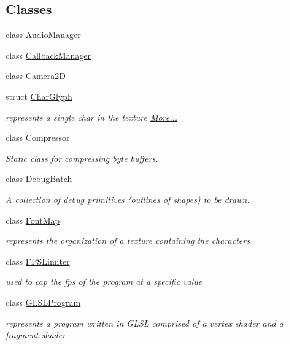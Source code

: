\subsection*{Classes}
\begin{DoxyCompactItemize}
\item 
class \hyperlink{classnta_1_1AudioManager}{Audio\+Manager}
\item 
class \hyperlink{classnta_1_1CallbackManager}{Callback\+Manager}
\item 
class \hyperlink{classnta_1_1Camera2D}{Camera2D}
\item 
struct \hyperlink{namespacenta_d4/d26/structnta_1_1CharGlyph}{Char\+Glyph}
\begin{DoxyCompactList}\small\item\em represents a single char in the texture  \hyperlink{namespacenta_d4/d26/structnta_1_1CharGlyph}{More...}\end{DoxyCompactList}\item 
class \hyperlink{classnta_1_1Compressor}{Compressor}
\begin{DoxyCompactList}\small\item\em Static class for compressing byte buffers. \end{DoxyCompactList}\item 
class \hyperlink{classnta_1_1DebugBatch}{Debug\+Batch}
\begin{DoxyCompactList}\small\item\em A collection of debug primitives (outlines of shapes) to be drawn. \end{DoxyCompactList}\item 
class \hyperlink{classnta_1_1FontMap}{Font\+Map}
\begin{DoxyCompactList}\small\item\em represents the organization of a texture containing the characters \end{DoxyCompactList}\item 
class \hyperlink{classnta_1_1FPSLimiter}{F\+P\+S\+Limiter}
\begin{DoxyCompactList}\small\item\em used to cap the fps of the program at a specific value \end{DoxyCompactList}\item 
class \hyperlink{classnta_1_1GLSLProgram}{G\+L\+S\+L\+Program}
\begin{DoxyCompactList}\small\item\em represents a program written in G\+L\+SL comprised of a vertex shader and a fragment shader \end{DoxyCompactList}\item 

\end{DoxyCompactItemize}
